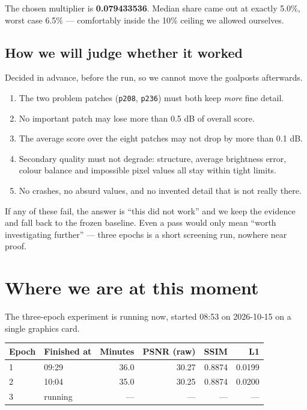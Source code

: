 \documentclass[11pt,a4paper]{article}
\newcommand{\code}[1]{\texttt{#1}}
\begin{document}
The chosen multiplier is \textbf{0.079433536}. Median share came out at exactly 5.0\%, worst case
6.5\% --- comfortably inside the 10\% ceiling we allowed ourselves.

\subsection{How we will judge whether it worked}

Decided in advance, before the run, so we cannot move the goalposts afterwards.

\begin{enumerate}
\item The two problem patches (\code{p208}, \code{p236}) must both keep \emph{more} fine detail.
\item No important patch may lose more than 0.5 dB of overall score.
\item The average score over the eight patches may not drop by more than 0.1 dB.
\item Secondary quality must not degrade: structure, average brightness error, colour balance and
      impossible pixel values all stay within tight limits.
\item No crashes, no absurd values, and no invented detail that is not really there.
\end{enumerate}

If any of these fail, the answer is ``this did not work'' and we keep the evidence and fall back to
the frozen baseline. Even a pass would only mean ``worth investigating further'' --- three epochs is
a short screening run, nowhere near proof.

\section{Where we are at this moment}

The three-epoch experiment is running now, started 08:53 on 2026-10-15 on a single graphics card.

\begin{center}
\begin{tabular}{@{}llrrrr@{}}
\hline
Epoch & Finished at & Minutes & PSNR (raw) & SSIM & L1 \\
\hline
1 & 09:29 & 36.0 & 30.27 & 0.8874 & 0.0199 \\
2 & 10:04 & 35.0 & 30.25 & 0.8874 & 0.0200 \\
3 & running & --- & --- & --- & --- \\
\hline
\end{tabular}
\end{center}
\end{document}
